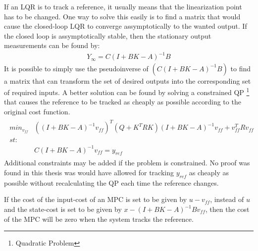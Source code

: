 \noindent
If an LQR is to track a reference, it usually means that the linearization point has to be changed. One way to solve this easily is to find a matrix that would cause the closed-loop LQR to converge assymptotically to the wanted output. If the closed loop is assymptotically stable, then the stationary output measurements can be found by: 
\begin{align}
  Y_{\infty} = C \left(I + BK -A \right)^{-1}B
\end{align}
It is possible to simply use the pseudoinverse of $\left(C \left(I + BK -A \right)^{-1}B\right)$ to find a matrix that can transform the set of desired outputs into the corresponding set of required inputs. A better solution can be found by solving a constrained QP \footnote{Quadratic Problem} that causes the reference to be tracked as cheaply as possible according to the original cost function. 
\begin{gather}
  \begin{split}
      min_{v_{ff}} & \left(\left( I +BK -A \right)^{-1} v_{ff}\right)^T \left(Q + K^T R K \right) \left( I + BK -A \right)^{-1}v_{ff} + v_{ff}^T R v_{ff} \\
      st:          &                                                                                                                                      \\
                  & C \left( I + BK - A  \right)^{-1} v_{ff} = y_{ref}                                                                                   
  \end{split}
\end{gather}
Additional constraints may be added if the problem is constrained. No proof was found in this thesis was would have allowed for tracking $y_{ref}$ as cheaply as possible without recalculating the QP each time the reference changes.

\noindent
If the cost of the input-cost of an MPC is set to be given by $u - v_{ff}$, instead of $u$ and the state-cost is set to be given by $ x - \left( I + BK -A \right)^{-1}Bv_{ff}$, then the cost of the MPC will be zero when the system tracks the reference.


